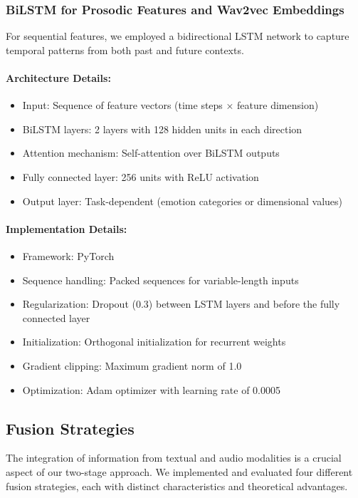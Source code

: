 \documentclass[12pt]{article}
\begin{document}
\subsubsection{BiLSTM for Prosodic Features and Wav2vec Embeddings}
For sequential features, we employed a bidirectional LSTM network to capture temporal patterns from both past and future contexts.

\paragraph{Architecture Details:}
\begin{itemize}
    \item Input: Sequence of feature vectors (time steps × feature dimension)
    \item BiLSTM layers: 2 layers with 128 hidden units in each direction
    \item Attention mechanism: Self-attention over BiLSTM outputs
    \item Fully connected layer: 256 units with ReLU activation
    \item Output layer: Task-dependent (emotion categories or dimensional values)
\end{itemize}

\paragraph{Implementation Details:}
\begin{itemize}
    \item Framework: PyTorch
    \item Sequence handling: Packed sequences for variable-length inputs
    \item Regularization: Dropout (0.3) between LSTM layers and before the fully connected layer
    \item Initialization: Orthogonal initialization for recurrent weights
    \item Gradient clipping: Maximum gradient norm of 1.0
    \item Optimization: Adam optimizer with learning rate of 0.0005
\end{itemize}

\subsection{Fusion Strategies}
\label{subsec:fusion}
The integration of information from textual and audio modalities is a crucial aspect of our two-stage approach. We implemented and evaluated four different fusion strategies, each with distinct characteristics and theoretical advantages.
\end{document}
